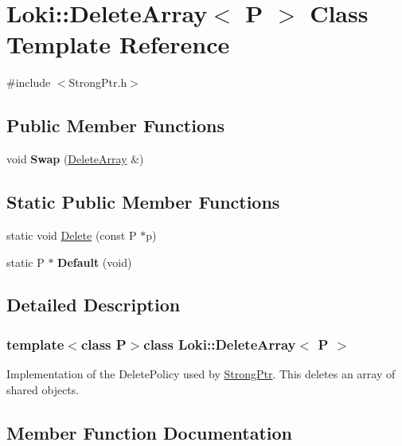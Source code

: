 \hypertarget{classLoki_1_1DeleteArray}{}\section{Loki\+:\+:Delete\+Array$<$ P $>$ Class Template Reference}
\label{classLoki_1_1DeleteArray}


{\ttfamily \#include $<$Strong\+Ptr.\+h$>$}

\subsection*{Public Member Functions}
\begin{DoxyCompactItemize}
\item 
\hypertarget{classLoki_1_1DeleteArray_aa95e44a00f747dcb4c9ee2bbabbb3367}{}void {\bfseries Swap} (\hyperlink{classLoki_1_1DeleteArray}{Delete\+Array} \&)\label{classLoki_1_1DeleteArray_aa95e44a00f747dcb4c9ee2bbabbb3367}

\end{DoxyCompactItemize}
\subsection*{Static Public Member Functions}
\begin{DoxyCompactItemize}
\item 
static void \hyperlink{classLoki_1_1DeleteArray_a380d2f3709e399755f52f6da3b2fb8ab}{Delete} (const P $\ast$p)
\item 
\hypertarget{classLoki_1_1DeleteArray_a5e388bee71181ab2f7b893775c6f5afd}{}static P $\ast$ {\bfseries Default} (void)\label{classLoki_1_1DeleteArray_a5e388bee71181ab2f7b893775c6f5afd}

\end{DoxyCompactItemize}


\subsection{Detailed Description}
\subsubsection*{template$<$class P$>$class Loki\+::\+Delete\+Array$<$ P $>$}

Implementation of the Delete\+Policy used by \hyperlink{classLoki_1_1StrongPtr}{Strong\+Ptr}. This deletes an array of shared objects. 

\subsection{Member Function Documentation}
\hypertarget{classLoki_1_1DeleteArray_a380d2f3709e399755f52f6da3b2fb8ab}{}
